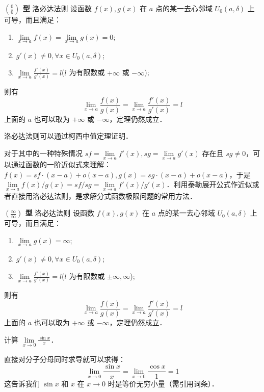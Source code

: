 
\begin{theorem}{\textbf{$\left(\frac{0}{0}\right)$ 型} 洛必达法则}
设函数 $f(x),g(x)$ 在 $a$ 点的某一去心邻域 $U_0(a,\delta)$ 上可导，而且满足：
\begin{enumerate}
\item $\lim\limits_{x\rightarrow a} f(x)=\lim\limits_{x\rightarrow a}g(x)=0$;
\item $g'(x)\neq 0,\forall x\in U_0(a,\delta)$;
\item $\lim\limits_{x\rightarrow a} \frac{f'(x)}{g'(x)}=l$($l$ 为有限数或 $+\infty$ 或 $-\infty$);
\end{enumerate}
则有
\begin{equation}
\lim\limits_{x\rightarrow a}\frac{f(x)}{g(x)}=\lim\limits_{x\rightarrow a}\frac{f'(x)}{g'(x)}=l
\end{equation}
上面的 $a$ 也可以取为 $+\infty$ 或 $-\infty$，定理仍然成立．
\end{theorem}
洛必达法则可以通过柯西中值定理证明．

对于其中的一种特殊情况 $sf=\lim\limits_{x\rightarrow a}f'(x),sg=\lim\limits_{x\rightarrow a}g'(x)$ 存在且 $sg\neq 0$，可以通过函数的一阶近似式来理解：$f(x)=sf\cdot (x-a)+o(x-a),g(x)=sg\cdot (x-a)+o(x-a)$，于是 $\lim\limits_{x\rightarrow a}f(x)/g(x)=sf/sg=\lim\limits_{x\rightarrow a}f'(x)/g'(x)$．利用泰勒展开公式作近似或者直接用洛必达法则，是求解分式函数极限问题的常用方法．

\begin{theorem}{\textbf{$\left(\frac{\infty}{\infty}\right)$ 型} 洛必达法则}
设函数 $f(x),g(x)$ 在 $a$ 点的某一去心邻域 $U_0(a,\delta)$ 上可导，而且满足：
\begin{enumerate}
\item $\lim\limits_{x\rightarrow a} g(x)=\infty$;
\item $g'(x)\neq 0,\forall x\in U_0(a,\delta)$;
\item $\lim\limits_{x\rightarrow a} \frac{f'(x)}{g'(x)}=l$($l$ 为有限数或 $\pm\infty,\infty$);
\end{enumerate}
则有
\begin{equation}
\lim\limits_{x\rightarrow a}\frac{f(x)}{g(x)}=\lim\limits_{x\rightarrow a}\frac{f'(x)}{g'(x)}=l
\end{equation}
上面的 $a$ 也可以取为 $+\infty$ 或 $-\infty$，定理仍然成立．
\end{theorem}
\begin{exercise}{}
计算 $\lim\limits_{x\rightarrow 0}\frac{\sin x}{x}$．
\end{exercise}
直接对分子分母同时求导就可以求得：
\begin{equation}
    \lim\limits_{x\rightarrow 0}\frac{\sin x}{x}=\lim\limits_{x\rightarrow 0}\frac{\cos x}{1}=1
\end{equation}
这告诉我们 $\sin x$ 和 $x$ 在 $x\rightarrow 0$ 时是等价无穷小量（需引用词条）．

